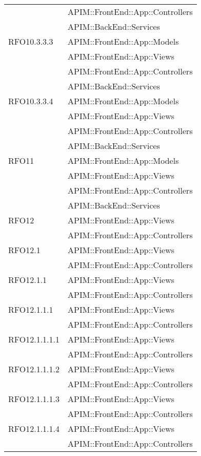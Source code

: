 \begin{longtable}{ p{4cm} | p{12cm} }
			& APIM::FrontEnd::App::Controllers \\
			& APIM::BackEnd::Services \\
			\hline	
			RFO10.3.3.3
			& APIM::FrontEnd::App::Models \\
			& APIM::FrontEnd::App::Views \\
			& APIM::FrontEnd::App::Controllers \\
			& APIM::BackEnd::Services \\
			\hline	
			RFO10.3.3.4
			& APIM::FrontEnd::App::Models \\
			& APIM::FrontEnd::App::Views \\
			& APIM::FrontEnd::App::Controllers \\
			& APIM::BackEnd::Services \\
			\hline	
			RFO11
			& APIM::FrontEnd::App::Models \\
			& APIM::FrontEnd::App::Views \\
			& APIM::FrontEnd::App::Controllers \\
			& APIM::BackEnd::Services \\
			\hline	
			RFO12
			& APIM::FrontEnd::App::Views \\
			& APIM::FrontEnd::App::Controllers \\
			\hline	
			RFO12.1
			& APIM::FrontEnd::App::Views \\
			& APIM::FrontEnd::App::Controllers \\
			\hline	
			RFO12.1.1
			& APIM::FrontEnd::App::Views \\
			& APIM::FrontEnd::App::Controllers \\
			\hline	
			RFO12.1.1.1
			& APIM::FrontEnd::App::Views \\
			& APIM::FrontEnd::App::Controllers \\
			\hline	
			RFO12.1.1.1.1
			& APIM::FrontEnd::App::Views \\
			& APIM::FrontEnd::App::Controllers \\
			\hline	
			RFO12.1.1.1.2
			& APIM::FrontEnd::App::Views \\
			& APIM::FrontEnd::App::Controllers \\
			\hline	
			RFO12.1.1.1.3
			& APIM::FrontEnd::App::Views \\
			& APIM::FrontEnd::App::Controllers \\
			\hline	
			RFO12.1.1.1.4
			& APIM::FrontEnd::App::Views \\
			& APIM::FrontEnd::App::Controllers \\
			\hline	

\end{longtable}
